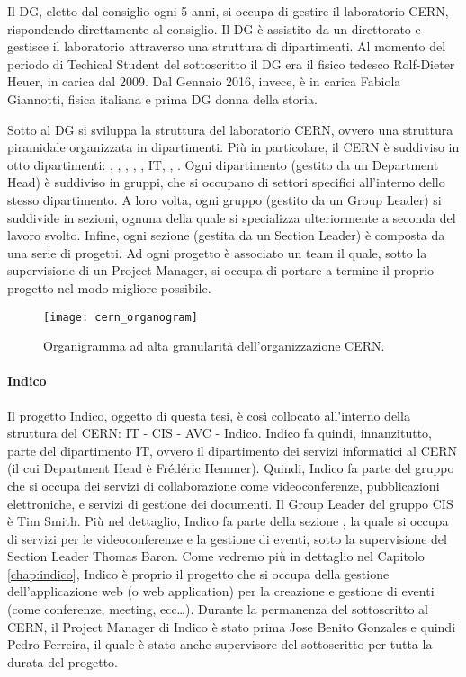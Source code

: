 			Il \ac{DG}, eletto dal consiglio ogni 5 anni, si occupa di gestire il laboratorio \ac{CERN}, rispondendo direttamente al consiglio. Il \ac{DG} è assistito da un direttorato e gestisce il laboratorio attraverso una struttura di dipartimenti. Al momento del periodo di Techical Student del sottoscritto il \ac{DG} era il fisico tedesco Rolf-Dieter Heuer, in carica dal 2009. Dal Gennaio 2016, invece, è in carica Fabiola Giannotti, fisica italiana e prima \ac{DG} donna della storia.
			
			Sotto al \ac{DG} si sviluppa la struttura del laboratorio \ac{CERN}, ovvero una struttura piramidale organizzata in dipartimenti. Più in particolare, il \ac{CERN} è suddiviso in otto dipartimenti: , , , , , \ac{IT}, , . Ogni dipartimento (gestito da un Department Head) è suddiviso in gruppi, che si occupano di settori specifici all'interno dello stesso dipartimento. A loro volta, ogni gruppo (gestito da un Group Leader) si suddivide in sezioni, ognuna della quale si specializza ulteriormente a seconda del lavoro svolto. Infine, ogni sezione (gestita da un Section Leader) è composta da una serie di progetti. Ad ogni progetto è associato un team il quale, sotto la supervisione di un Project Manager, si occupa di portare a termine il proprio progetto nel modo migliore possibile. \cite{cern:structure}

			\begin{figure}[h!]
				\begin{center}
					\texttt{[image: cern\_organogram]}
				\end{center}
				\caption[Organigramma del CERN]{Organigramma ad alta granularità dell'organizzazione CERN.}
				\label{fig:cern_organogram}
			\end{figure}
			
			\paragraph{Indico}Il progetto Indico, oggetto di questa tesi, è così collocato all'interno della struttura del \ac{CERN}: \ac{IT} - \acs{CIS} - \acs{AVC} - Indico. Indico fa quindi, innanzitutto, parte del dipartimento \ac{IT}, ovvero il dipartimento dei servizi informatici al \ac{CERN} (il cui Department Head è Frédéric Hemmer). Quindi, Indico fa parte del gruppo  che si occupa dei servizi di collaborazione come videoconferenze, pubblicazioni elettroniche, e servizi di gestione dei documenti. Il Group Leader del gruppo \ac{CIS} è Tim Smith. Più nel dettaglio, Indico fa parte della sezione , la quale si occupa di servizi per le videoconferenze e la gestione di eventi, sotto la supervisione del Section Leader Thomas Baron. Come vedremo più in dettaglio nel Capitolo \ref{chap:indico}, Indico è proprio il progetto che si occupa della gestione dell'applicazione web (o web application) per la creazione e gestione di eventi (come conferenze, meeting, ecc\dots). Durante la permanenza del sottoscritto al \ac{CERN}, il Project Manager di Indico è stato prima Jose Benito Gonzales e quindi Pedro Ferreira, il quale è stato anche supervisore del sottoscritto per tutta la durata del progetto.
		
